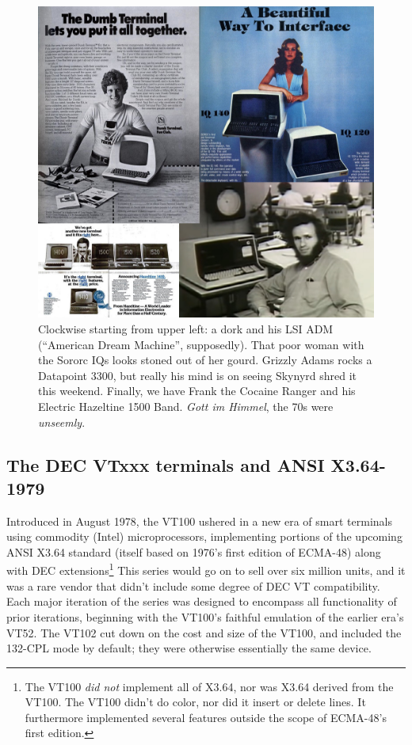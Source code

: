 \documentclass[letterpaper,10pt]{article}
\begin{document}
\begin{appendices}
\begin{figure}
  \centering \includegraphics[width=.9\linewidth]{media/dumbterminals.jpg}
\caption{Clockwise starting from upper left: a dork and his LSI ADM (``American
  Dream Machine'', supposedly). That poor woman with the Sororc IQs looks stoned out
  of her gourd. Grizzly Adams rocks a Datapoint 3300, but really his mind is on
  seeing Skynyrd shred it this weekend. Finally, we have Frank the Cocaine
  Ranger and his Electric Hazeltine 1500 Band. \textit{Gott im Himmel}, the 70s were \textit{unseemly}.}
\end{figure}

\subsection{The DEC VTxxx terminals and ANSI X3.64-1979}

Introduced in August 1978, the VT100 ushered in a new era of smart terminals
using commodity (Intel) microprocessors, implementing portions of the upcoming
ANSI X3.64 standard (itself based on 1976's first edition of ECMA-48) along
with DEC extensions\footnote{The VT100 \textit{did not} implement all of X3.64,
nor was X3.64 derived from the VT100. The VT100 didn't do color, nor did it
insert or delete lines. It furthermore implemented several features outside
the scope of ECMA-48's first edition.} This series would go on to sell over
six million units, and it was a rare vendor that didn't include some degree
of DEC VT compatibility. Each major iteration of the series was designed to
encompass all functionality of prior iterations, beginning with the VT100's
faithful emulation of the earlier era's VT52. The VT102 cut down on the cost
and size of the VT100, and included the 132-CPL mode by default; they were
otherwise essentially the same device\cite{vt100}.


\end{appendices}
\end{document}
